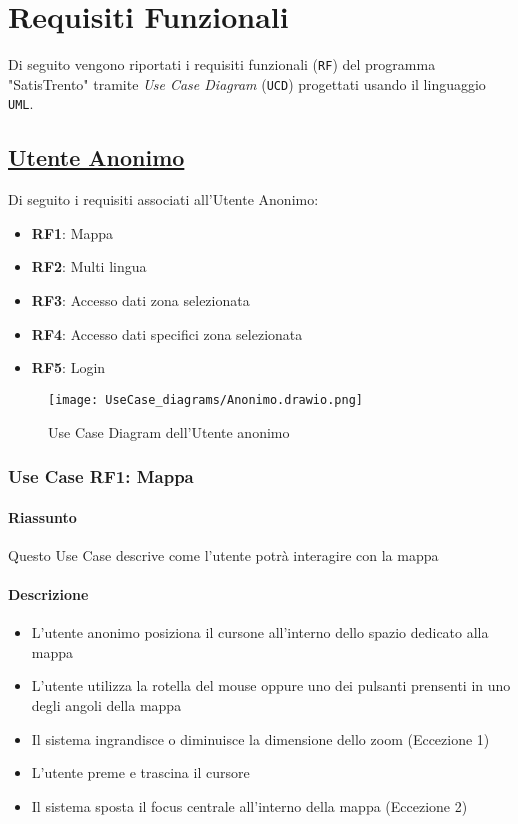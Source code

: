 \chapter{Requisiti Funzionali}
\label{ch:requisitiFunzionali}

Di seguito vengono riportati i requisiti funzionali (\texttt{RF}) del programma "SatisTrento" tramite \textit{Use Case Diagram} (\texttt{UCD}) progettati usando il linguaggio \texttt{UML}.

\section{\underline{Utente Anonimo}}
    Di seguito i requisiti associati all'Utente Anonimo:
    \begin{itemize}
        \item \textbf{RF1}: Mappa
        \item \textbf{RF2}: Multi lingua
        \item \textbf{RF3}: Accesso dati zona selezionata
        \item \textbf{RF4}: Accesso dati specifici zona selezionata
        \item \textbf{RF5}: Login
    \end{itemize}
    \begin{figure}[H]
        \centering
        \texttt{[image: UseCase\_diagrams/Anonimo.drawio.png]}
        \caption{Use Case Diagram dell'Utente anonimo}
    \end{figure}

    \subsection{Use Case RF1: Mappa}
        \subsubsection{Riassunto}
            Questo Use Case descrive come l'utente potrà interagire con la mappa
        \subsubsection{Descrizione}
            \begin{itemize}
                \item L'utente anonimo posiziona il cursone all'interno dello spazio dedicato alla mappa
                \item L'utente utilizza la rotella del mouse oppure uno dei pulsanti prensenti in uno degli angoli della mappa
                \item Il sistema ingrandisce o diminuisce la dimensione dello zoom (Eccezione 1)
                \item L'utente preme e trascina il cursore
                \item Il sistema sposta il focus centrale all'interno della mappa (Eccezione 2)
            \end{itemize}
